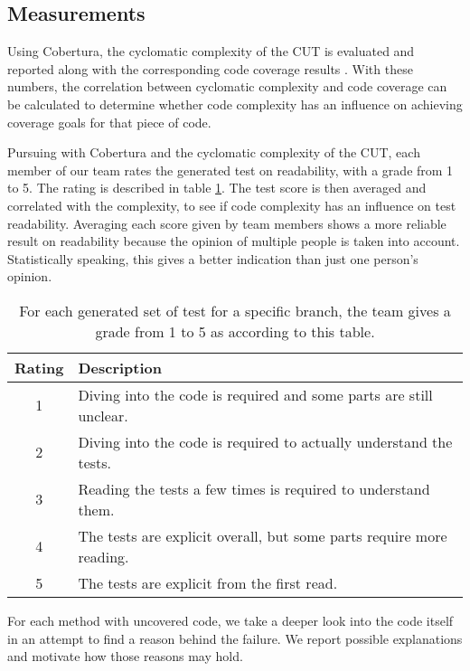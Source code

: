 \subsection{Measurements}

Using Cobertura, the cyclomatic complexity of the CUT is evaluated and reported along with the corresponding code coverage results \cite{COBERTURA}. 
With these numbers, the correlation between cyclomatic complexity and code coverage can be calculated to determine whether code complexity has an influence on achieving coverage goals for that piece of code. 

Pursuing with Cobertura and the cyclomatic complexity of the CUT, each member of our team rates the generated test on readability, with a grade from 1 to 5. 
The rating is described in table \ref{readability}. 
The test score is then averaged and correlated with the complexity, to see if code complexity has an influence on test readability. 
Averaging each score given by team members shows a more reliable result on readability because the opinion of multiple people is taken into account. 
Statistically speaking, this gives a better indication than just one person's opinion.

{\setlength{\extrarowheight}{1ex}
\begin{table}[tbp]
\begin{center}
\begin{tabular}{ c m{10cm} }
\hline 
Rating & Description \\ [0.5ex] 
\hline
1 & Diving into the code is required and some parts are still unclear. \\ [0.5ex] 
2 & Diving into the code is required to actually understand the tests. \\ [0.5ex] 
3 & Reading the tests a few times is required to understand them. \\ [0.5ex] 
4 & The tests are explicit overall, but some parts require more reading.  \\ [0.5ex] 
5 & The tests are explicit from the first read. \\ [0.5ex] 
\hline
\end{tabular}
\end{center}
\caption{For each generated set of test for a specific branch, the team gives a grade from 1 to 5 as according to this table.}
\label{readability}
\end{table}
}

For each method with uncovered code, we take a deeper look into the code itself in an attempt to find a reason behind the failure.
We report possible explanations and motivate how those reasons may hold. 
